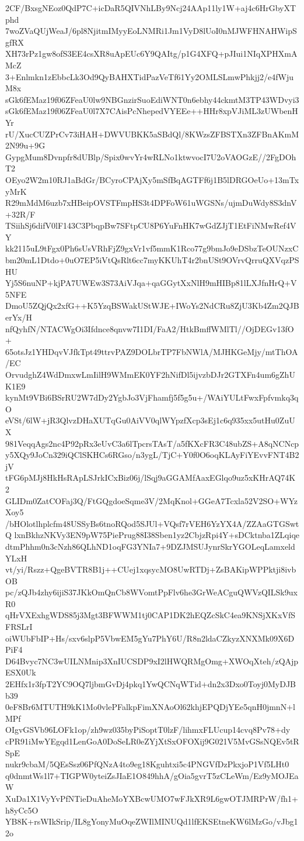 2CF/BxsgNEoz0QdP7C+icDaR5QIVNhLBy9Ncj24AAp11ly1W+aj4c6HrGbyXTphd
7woZVaQUjWeaJ/6pl8NjitmIMyyEoLNMRi1Jm1VyD8lUoI0nMJWFHNAHWipSgfRX
XH73rPz1gw8ofS3EE4csXR8uApEUc6Y9QAItg/p1G4XFQ+pJIui1NIqXPHXmAMcZ
3+Enlmkn1zEbbcLk3Od9QyBAHXTidPazVeTf61Yy2OMLSLmwPhkjj2/e4fWjuM8x
sGk6fEMaz19f06ZFeaU0lw9NBGnzirSuoEdiWNT0n6ebhy44ckmtM3TP43WDvyi3
sGk6fEMaz19f06ZFeaU0l7X7CAisPcNhepedVYEEe++HHr8xpVJiML3zUWbenHYr
rU/XucCUZPrCv73iHAH+DWVUBKK5aSBdQl/8KWzsZFBSTXn3ZFBnAKmM2N99u+9G
GypgMum8Dvnpfr8dUBlp/Spix0wvYr4wRLNo1ktwvocI7U2oVAOGzE//2FgDOhT2
OEyo2W2m10RJ1aBdGr/BCyroCPAjXy5mSfBqAGTFf6j1B5lDRGOeUo+13mTxyMrK
R29mMdM6uzb7xHBeipOVSTFmpHS3t4DPFoW61uWGSNs/ujmDuWdy8S3dnV+32R/F
TSiihSj6difV0lF143C3PbqpBw7SFtpCU8P6YuFnHK7wGdZJjT1EtFiNMwRef4VY
kk2115uL9tFgx0Ph6sUsVRhFjZ9gxVr1vf5mmK1Rco77g9bmJo9eDSbzTeOUNzxC
bm20mL1Dtdo+0uO7EP5iVtQsRlt6cc7myKKUhT4r2bnUSt9OVrvQrruQXVqzPSHU
Yj5S6nuNP+kjPA7UWEw3S73AiVJqa+qaGGytXxNlH9mHIBp81lLXJfnHrQ+V5NFE
DmoU5ZQjQx2xfG++K5YzqBSWakUStWJE+IWoYs2NdCRu8ZjU3Kb4Zm2QJBerYx/H
nfQyhfN/NTACWgOi3Ifdnce8qnvw7I1DI/FaA2/HtkBmffWMlTl//OjDEGv13fO+
65otsJz1YHDqvVJfkTpt49ttrvPAZ9DOLbrTP7FbNWlA/MJHKGeMjy/mtThOA/EC
OrvudghZ4WdDmxwLmIilH9WMmEK0YF2hNifDl5ijvzbDJr2GTXFn4um6gZhUK1E9
kynMt9VBi6BSrRU2W7dDy2YgbJo3VjFhamfj5f5g5u+/WAiYULtFwxFpfvmkq3qO
eVSt/6lW+jR3QlvzDHaXUTqGu0AiVV0qlWYpzfXcp3sEj1c6q935xx5utHu0ZuUX
981VeqqAgs2nc4P92pRx3eUvC3a6lTpcrsTAsT/a5fKXcFR3C48ubZS+A8qNCNcp
y5XQy9JoCn329iQClSKHCs6RGso/n3ygL/TjC+Y0f0O6oqKLAyFiYEvvFNT4B2jV
tFG6pMJj8HkHsRApLSJrkICxBiz06j/lSqj9aGGAMfAaxEGlqo9uz5xKHrAQ74K2
GLIDm0ZatCOFaj3Q/FtGQgdoeSqme3V/2MqKnol+GGeA7Tcxla52V2SO+WYzXoy5
/bHOlotlhplcfm48USSyBs6tnoRQod5SJUl+VQsf7rVEH6YzYX4A/ZZAaGTGSwtQ
lxnBkhzNKVy3EN9pW75PiePrug88I38Sben1yz2CbjzRpi4Y+sDCktnba1ZLqiqe
dtmPhhm0n3cNzh86QLhND1oqFG3YNIa7+9DZJMSUJynrSkrYGOLeqLamxeldYLxH
vt/yi/Rszz+QgeBVTR8B1j++CUej1xqsycMO8UwRTDj+ZsBAKipWPPktji8ivbOB
pc/zQJb4zhy6ijiS37JKkOmQnCb8WVomtPpFlv6he3GrWeACguQWVzQILSk9uxR0
qHrVXExhgWDS85j3Mgt3BFWWM1tj0CAP1DK2hEQZcSkC4ea9KNSjXKxVfSFRSLrI
oiWUbFbIP+Hs/sxv6slpP5VbwEM5gYu7PhY6U/R8n2ldaCZkyzXNXMk09X6DPiF4
D64Bvyc7NC3wUILNMnip3XnIUCSDP9xI2lHWQRMgOmg+XWOqXteh/zQAjpESX0Uk
2EHfx1r3fpT2YC9OQ7ljbmGvDj4pkq1YwQCNqWTid+dn2x3Dxo0Toyj0MyDJBb39
0eF8Br6MTUTH9kK1Mo0vlePFalkpFimXNAoOl62khjEPQDjYEe5qnH0jmnN+lMPf
OIgvGSVb96LOFk1op/zh9wz035byPiSoptT0lzF/lihmxFLUcup14cvq8Pv78+dy
cPR91iMwYEgqd1LenGoA0DoSeLR0eZYjXtSxOFOXij9G021V5MvGSsNQEv5tRSpE
nukr9cbaM/5QEsSsz06PfQNzA4to9eg18Kguhtxi5c4PNGVfDzPkxjoP1Vf5LHt0
q0dnmtWs1l7+TIGPW0yteiZsJIaE1O849hhA/gOia5gvrT5zCLeWm/Ez9yMOJEaW
XuDa1X1VyYvPfNTieDuAheMoYXBcwUMO7wFJkXR9L6gwOTJMRPrW/fh1+h8yCc5O
YB8K+rsWIkSrip/IL8gYonyMuOqeZWIlMINUQd1lfEKSEtneKW6lMzGo/vJbg12o
